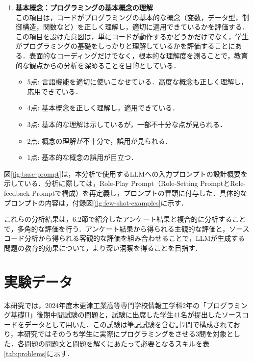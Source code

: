 \documentclass[11pt]{jreport}
\begin{document}
\begin{enumerate}
    \item \textbf{基本概念：プログラミングの基本概念の理解} \\
    この項目は，コードがプログラミングの基本的な概念（変数，データ型，制御構造，関数など）を正しく理解し，適切に適用できているかを評価する．この項目を設けた意図は，単にコードが動作するかどうかだけでなく，学生がプログラミングの基礎をしっかりと理解しているかを評価することにある．表面的なコーディングだけでなく，根本的な理解度を測ることで，教育的な観点からの分析を深めることを目的としている．
    \begin{itemize}
        \item 5点: 言語機能を適切に使いこなせている．高度な概念も正しく理解し，応用できている．
        \item 4点: 基本概念を正しく理解し，適用できている．
        \item 3点: 基本的な理解は示しているが，一部不十分な点が見られる．
        \item 2点: 概念の理解が不十分で，誤用が見られる．
        \item 1点: 基本的な概念の誤用が目立つ．
    \end{itemize}
\end{enumerate}
図\ref{fig:base-prompt}は，本分析で使用するLLMへの入力プロンプトの設計概要を示している．分析に際しては，Role-Play Prompt（Role-Setting PromptとRole-feedback Promptで構成）を再定義し，プロンプトの冒頭に付与した．具体的なプロンプトの内容は，付録図\ref{fig:few-shot-examples}に示す．

これらの分析結果は，6.2節で紹介したアンケート結果と複合的に分析することで，多角的な評価を行う．アンケート結果から得られる主観的な評価と，ソースコード分析から得られる客観的な評価を組み合わせることで，LLMが生成する問題の教育的効果について，より深い洞察を得ることを目指す．
\section{実験データ}

本研究では，2024年度木更津工業高等専門学校情報工学科2年の「プログラミング基礎II」後期中間試験の問題と，試験に出席した学生41名が提出したソースコードをデータとして用いた．この試験は筆記試験を含む計7問で構成されており，本研究ではそのうち学生に実際にプログラミングをさせる3問を対象とした．各問題の問題文と問題を解くにあたって必要となるスキルを表\ref{tab:problems}に示す．
\end{document}
